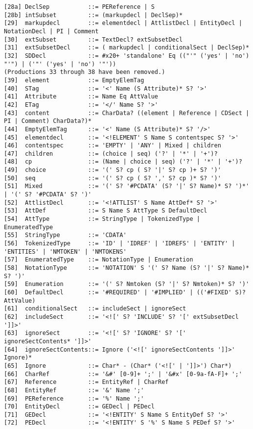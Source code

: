 \documentclass[onlymath]{beamer}
\begin{document}
\begin{frame}[fragile]
\begin{verbatim}
[28a] DeclSep           ::= PEReference | S
[28b] intSubset         ::= (markupdecl | DeclSep)*
[29]  markupdecl        ::= elementdecl | AttlistDecl | EntityDecl | NotationDecl | PI | Comment
[30]  extSubset         ::= TextDecl? extSubsetDecl
[31]  extSubsetDecl     ::= ( markupdecl | conditionalSect | DeclSep)*
[32]  SDDecl            ::= #x20+ 'standalone' Eq (("'" ('yes' | 'no') "'") | ('"' ('yes' | 'no') '"'))
(Productions 33 through 38 have been removed.)
[39]  element           ::= EmptyElemTag
[40]  STag              ::= '<' Name (S Attribute)* S? '>'
[41]  Attribute         ::= Name Eq AttValue
[42]  ETag              ::= '</' Name S? '>'
[43]  content           ::= CharData? ((element | Reference | CDSect | PI | Comment) CharData?)*
[44]  EmptyElemTag      ::= '<' Name (S Attribute)* S? '/>'
[45]  elementdecl       ::= '<!ELEMENT' S Name S contentspec S? '>'
[46]  contentspec       ::= 'EMPTY' | 'ANY' | Mixed | children
[47]  children          ::= (choice | seq) ('?' | '*' | '+')?
[48]  cp                ::= (Name | choice | seq) ('?' | '*' | '+')?
[49]  choice            ::= '(' S? cp ( S? '|' S? cp )+ S? ')'
[50]  seq               ::= '(' S? cp ( S? ',' S? cp )* S? ')'
[51]  Mixed             ::= '(' S? '#PCDATA' (S? '|' S? Name)* S? ')*' | '(' S? '#PCDATA' S? ')'
[52]  AttlistDecl       ::= '<!ATTLIST' S Name AttDef* S? '>'
[53]  AttDef            ::= S Name S AttType S DefaultDecl
[54]  AttType           ::= StringType | TokenizedType | EnumeratedType
[55]  StringType        ::= 'CDATA'
[56]  TokenizedType     ::= 'ID' | 'IDREF' | 'IDREFS' | 'ENTITY' | 'ENTITIES' | 'NMTOKEN' | 'NMTOKENS'
[57]  EnumeratedType    ::= NotationType | Enumeration
[58]  NotationType      ::= 'NOTATION' S '(' S? Name (S? '|' S? Name)* S? ')'
[59]  Enumeration       ::= '(' S? Nmtoken (S? '|' S? Nmtoken)* S? ')'
[60]  DefaultDecl       ::= '#REQUIRED' | '#IMPLIED' | (('#FIXED' S)? AttValue)
[61]  conditionalSect   ::= includeSect | ignoreSect
[62]  includeSect       ::= '<![' S? 'INCLUDE' S? '[' extSubsetDecl ']]>'
[63]  ignoreSect        ::= '<![' S? 'IGNORE' S? '[' ignoreSectContents* ']]>'
[64]  ignoreSectContents::= Ignore ('<![' ignoreSectContents ']]>' Ignore)*
[65]  Ignore            ::= Char* - (Char* ('<![' | ']]>') Char*)
[66]  CharRef           ::= '&#' [0-9]+ ';' | '&#x' [0-9a-fA-F]+ ';'
[67]  Reference         ::= EntityRef | CharRef
[68]  EntityRef         ::= '&' Name ';'
[69]  PEReference       ::= '%' Name ';'
[70]  EntityDecl        ::= GEDecl | PEDecl
[71]  GEDecl            ::= '<!ENTITY' S Name S EntityDef S? '>'
[72]  PEDecl            ::= '<!ENTITY' S '%' S Name S PEDef S? '>'

\end{verbatim}
\end{frame}
\end{document}

